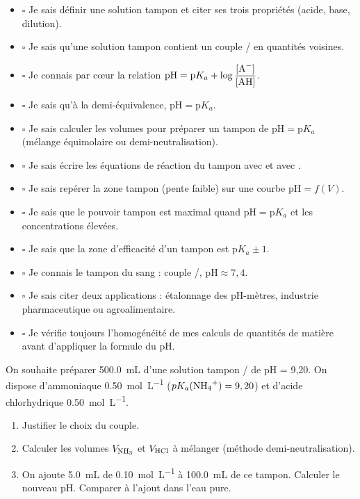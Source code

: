 \documentclass[11pt]{article}
\begin{document}
\begin{aretenir}
\begin{itemize}
  \item $\square$ Je sais définir une solution tampon et citer ses trois propriétés (acide, base, dilution).
  \item $\square$ Je sais qu'une solution tampon contient un couple / en quantités voisines.
  \item $\square$ Je connais par cœur la relation $\mathrm{pH} = \mathrm{p}K_a + \log\dfrac{[\ce{A-}]}{[\ce{AH}]}$.
  \item $\square$ Je sais qu'à la demi-équivalence, $\mathrm{pH} = \mathrm{p}K_a$.
  \item $\square$ Je sais calculer les volumes pour préparer un tampon de $\mathrm{pH} = \mathrm{p}K_a$ (mélange équimolaire ou demi-neutralisation).
  \item $\square$ Je sais écrire les équations de réaction du tampon avec  et avec .
  \item $\square$ Je sais repérer la zone tampon (pente faible) sur une courbe $\mathrm{pH} = f(V)$.
  \item $\square$ Je sais que le pouvoir tampon est maximal quand $\mathrm{pH} = \mathrm{p}K_a$ et les concentrations élevées.
  \item $\square$ Je sais que la zone d'efficacité d'un tampon est $\mathrm{p}K_a \pm 1$.
  \item $\square$ Je connais le tampon du sang : couple /, $\mathrm{pH} \approx 7{,}4$.
  \item $\square$ Je sais citer deux applications : étalonnage des pH-mètres, industrie pharmaceutique ou agroalimentaire.
  \item $\square$ Je vérifie toujours l'homogénéité de mes calculs de quantités de matière avant d'appliquer la formule du pH.
\end{itemize}
\end{aretenir}

\begin{exercice}
On souhaite préparer \SI{500,0}{mL} d'une solution tampon / de pH = 9,20. On dispose d'ammoniaque \SI{0,50}{mol.L^{-1}} ($pK_a(\ce{NH4+}) = 9,20$) et d'acide chlorhydrique \SI{0,50}{mol.L^{-1}}.
\begin{enumerate}
  \item Justifier le choix du couple.
  \item Calculer les volumes $V_{\ce{NH3}}$ et $V_{\ce{HCl}}$ à mélanger (méthode demi-neutralisation).
  \item On ajoute \SI{5,0}{mL} de  \SI{0,10}{mol.L^{-1}} à \SI{100,0}{mL} de ce tampon. Calculer le nouveau pH. Comparer à l'ajout dans l'eau pure.
\end{enumerate}
\end{exercice}
\end{document}
